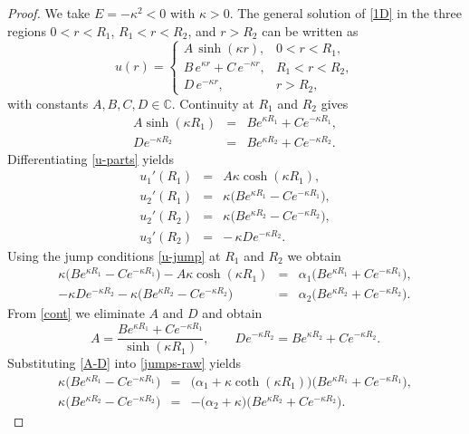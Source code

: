 \documentclass[a4paper,11pt]{article}
\numberwithin{equation}{section}
\theoremstyle{definition}
\theoremstyle{remark}
\begin{document}
\begin{proof}
We take $E=-\kappa^2<0$ with $\kappa>0$.
The general solution of \eqref{1D} in the three regions $0<r<R_1$,
$R_1<r<R_2$, and $r>R_2$ can be written as
\begin{equation}\label{u-parts}
u(r)=
\begin{cases}
A\,\sinh(\kappa r), & 0<r<R_1,\\[1ex]
B\,e^{\kappa r}+C\,e^{-\kappa r}, & R_1<r<R_2,\\[1ex]
D\,e^{-\kappa r}, & r>R_2,
\end{cases}
\end{equation}
with constants $A,B,C,D\in\mathbb C$.
Continuity at $R_1$ and $R_2$ gives
\begin{eqnarray}\label{cont}
A\sinh(\kappa R_1) &=& B e^{\kappa R_1}+C e^{-\kappa R_1},\\
D e^{-\kappa R_2} &=& B e^{\kappa R_2}+C e^{-\kappa R_2}.
\end{eqnarray}
Differentiating \eqref{u-parts} yields
\begin{eqnarray}\label{derivs}
u_1'(R_1) &=& A\kappa\cosh(\kappa R_1),\nonumber\\
u_2'(R_1) &=& \kappa\bigl(B e^{\kappa R_1}-C e^{-\kappa R_1}\bigr),\nonumber\\
u_2'(R_2) &=& \kappa\bigl(B e^{\kappa R_2}-C e^{-\kappa R_2}\bigr),\nonumber\\
u_3'(R_2) &=& -\,\kappa D e^{-\kappa R_2}.
\end{eqnarray}
Using the jump conditions \eqref{u-jump} at $R_1$ and $R_2$ we obtain
\begin{eqnarray}\label{jumps-raw}
\kappa\bigl(B e^{\kappa R_1}-C e^{-\kappa R_1}\bigr)-A\kappa\cosh(\kappa R_1)
&=& \alpha_1\bigl(B e^{\kappa R_1}+C e^{-\kappa R_1}\bigr),\\
-\kappa D e^{-\kappa R_2}-\kappa\bigl(B e^{\kappa R_2}-C e^{-\kappa R_2}\bigr)
&=& \alpha_2\bigl(B e^{\kappa R_2}+C e^{-\kappa R_2}\bigr).
\end{eqnarray}
From \eqref{cont} we eliminate $A$ and $D$ and obtain
\begin{equation}\label{A-D}
A=\frac{B e^{\kappa R_1}+C e^{-\kappa R_1}}{\sinh(\kappa R_1)},\qquad
D e^{-\kappa R_2}=B e^{\kappa R_2}+C e^{-\kappa R_2}.
\end{equation}
Substituting \eqref{A-D} into \eqref{jumps-raw} yields
\begin{eqnarray}\label{two-eqs}
\kappa\bigl(B e^{\kappa R_1}-C e^{-\kappa R_1}\bigr)
&=&\bigl(\alpha_1+\kappa\coth(\kappa R_1)\bigr)\bigl(B e^{\kappa R_1}+C e^{-\kappa R_1}\bigr),\\
\kappa\bigl(B e^{\kappa R_2}-C e^{-\kappa R_2}\bigr)
&=&-\bigl(\alpha_2+\kappa\bigr)\bigl(B e^{\kappa R_2}+C e^{-\kappa R_2}\bigr).
\end{eqnarray}


\end{proof}
\end{document}
